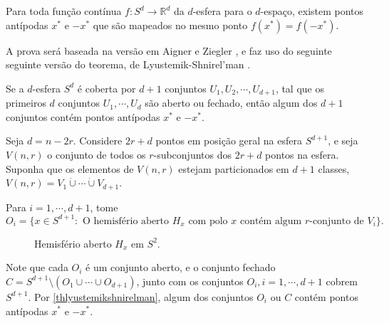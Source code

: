 \begin{teorema}\label{thborsukulam}
Para toda função contínua $f: S^d \rightarrow\mathbb{R}^d$ da $d$-esfera para o $d$-espaço, existem pontos antípodas $x^*$ e $-x^*$ que são mapeados no mesmo ponto $f(x^*) = f(-x^*)$.
\end{teorema}

A prova será baseada na versão em Aigner e Ziegler \cite{aigner2010proofs}, e faz uso do seguinte seguinte versão do teorema, de Lyustemik-Shnirel'man \cite{lyusternik1947topological}.

\begin{teorema}\label{thlyustemikshnirelman}
Se a $d$-esfera $S^d$ é coberta por $d+1$ conjuntos $U_1, U_2, \cdots, U_{d+1}$, tal que os primeiros $d$ conjuntos $U_1,\cdots,U_d$ são aberto ou fechado, então algum dos $d+1$ conjuntos contém pontos antípodas $x^*$ e $-x^*$.
\end{teorema}

Seja $d = n - 2r$. Considere $2r+d$ pontos em posição geral na esfera $S^{d+1}$, e seja $V(n,r)$ o conjunto de todos os $r$-subconjuntos dos $2r+d$ pontos na esfera. Suponha que os elementos de $V(n,r)$ estejam particionados em $d+1$ classes, $V(n,r) = V_1 \dot\cup \cdots \dot\cup V_{d+1}$.

Para $i=1,\cdots,d+1$, tome \[O_i = \{x\in S^{d+1} : \text{ O hemisfério aberto } H_x \text{ com polo } x \text{ contém algum } r\text{-conjunto de } V_i\}.\]

\begin{figure}[H]
\centering
{}
\caption{Hemisfério aberto $H_x$ em $S^2$.}
\label{fig:kneserhemisphere}
\end{figure}

Note que cada $O_i$ é um conjunto aberto, e o conjunto fechado $C = S^{d+1}\setminus (O_1\cup \cdots \cup O_{d+1})$, junto com os conjuntos $O_i, i=1,\cdots,d+1$ cobrem $S^{d+1}$. Por \ref{thlyustemikshnirelman}, algum dos conjuntos $O_i$ ou $C$ contém pontos antípodas $x^*$ e $-x^*$.

